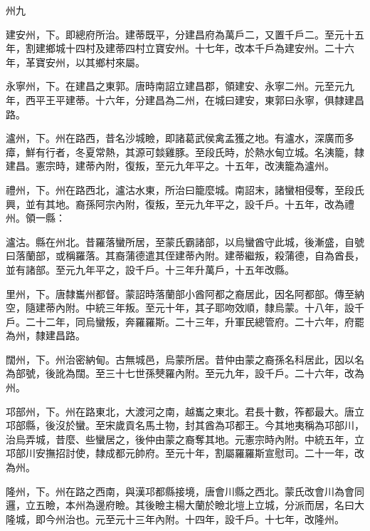 \begin{pinyinscope}
 州九



 建安州，下。即總府所治。建蒂既平，分建昌府為萬戶二，又置千戶二。至元十五年，割建鄉城十四村及建蒂四村立寶安州。十七年，改本千戶為建安州。二十六年，革寶安州，以其鄉村來屬。



 永寧州，下。在建昌之東郭。唐時南詔立建昌郡，領建安、永寧二州。元至元九年，西平王平建蒂。十六年，分建昌為二州，在城曰建安，東郭曰永寧，俱隸建昌路。



 瀘州，下。州在路西，昔名沙城瞼，即諸葛武侯禽孟獲之地。有瀘水，深廣而多瘴，鮮有行者，冬夏常熱，其源可燅雞豚。至段氏時，於熱水甸立城。名洟籠，隸建昌。憲宗時，建蒂內附，復叛，至元九年平之。十五年，改洟籠為瀘州。



 禮州，下。州在路西北，瀘沽水東，所治曰籠麼城。南詔末，諸蠻相侵奪，至段氏興，並有其地。裔孫阿宗內附，復叛，至元九年平之，設千戶。十五年，改為禮州。領一縣：



 瀘沽。縣在州北。昔羅落蠻所居，至蒙氏霸諸部，以烏蠻酋守此城，後漸盛，自號曰落蘭部，或稱羅落。其裔蒲德遣其侄建蒂內附。建蒂繼叛，殺蒲德，自為酋長，並有諸部。至元九年平之，設千戶。十三年升萬戶，十五年改縣。



 里州，下。唐隸巂州都督。蒙詔時落蘭部小酋阿都之裔居此，因名阿都部。傳至納空，隨建蒂內附。中統三年叛。至元十年，其子耶吻效順，隸烏蒙。十八年，設千戶。二十二年，同烏蠻叛，奔羅羅斯。二十三年，升軍民總管府。二十六年，府罷為州，隸建昌路。



 闊州，下。州治密納甸。古無城邑，烏蒙所居。昔仲由蒙之裔孫名科居此，因以名為部號，後訛為闊。至三十七世孫僰羅內附。至元九年，設千戶。二十六年，改為州。



 邛部州，下。州在路東北，大渡河之南，越巂之東北。君長十數，筰都最大。唐立邛部縣，後沒於蠻。至宋歲貢名馬土物，封其酋為邛都王。今其地夷稱為邛部川，治烏弄城，昔麼、些蠻居之，後仲由蒙之裔奪其地。元憲宗時內附。中統五年，立邛部川安撫招討使，隸成都元帥府。至元十年，割屬羅羅斯宣慰司。二十一年，改為州。



 隆州，下。州在路之西南，與漢邛都縣接境，唐會川縣之西北。蒙氏改會川為會同邏，立五瞼，本州為邊府瞼。其後瞼主楊大蘭於瞼北塏上立城，分派而居，名曰大隆城，即今州治也。元至元十三年內附。十四年，設千戶。十七年，改隆州。




\end{pinyinscope}
